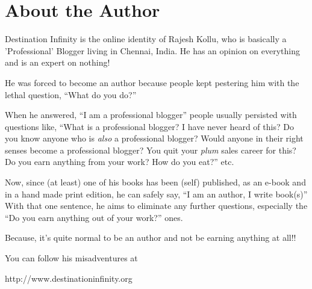 \chapter{About the Author}

Destination Infinity is the online identity of Rajesh Kollu, who is basically a
'Professional' Blogger living in Chennai, India. He has an opinion on everything
and is an expert on nothing!

He was forced to become an author because people kept pestering him with the
lethal question, “What do you do?”

When he answered, “I am a professional blogger” people usually persisted with
questions like, “What is a professional blogger? I have never heard of this? Do
you know anyone who is \emph{also} a professional blogger? Would anyone in their
right senses become a professional blogger? You quit your \emph{plum} sales
career for this? Do you earn anything from your work? How do you eat?” etc.

Now, since (at least) one of his books has been (self) published, as an e-book
and in a hand made print edition, he can safely say, “I am an author, I write
book(s)” With that one sentence, he aims to eliminate any further questions,
especially the “Do you earn anything out of your work?” ones.

Because, it's quite normal to be an author and not be earning anything at all!! \faGrinBeam[regular]

You can follow his misadventures at

\vspace{1ex}

\centerline{http://www.destinationinfinity.org}